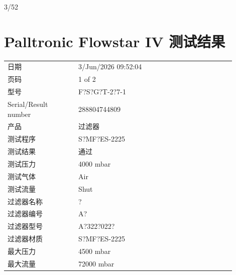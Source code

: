 \documentclass[UTF8,10pt,a4paper,fontset=fandol]{ctexart}
\newcommand{\fieldvalue}[1]{#1}
\newcommand{\handwritten}[1]{#1}
\begin{document}
\vspace{1em}
\handwritten{3/52}

\newpage

\section{Palltronic Flowstar IV 测试结果}

\begin{tabular}{@{}p{0.28\linewidth}p{0.62\linewidth}@{}}
日期 &
\fieldvalue{3/Jun/2026 09:52:04}
\\
页码 &
\fieldvalue{1 of 2}
\\
型号 &
\fieldvalue{F?S?G?T-2?7-1}
\\
Serial/Result number &
\fieldvalue{288804744809}
\\
产品 &
\fieldvalue{过滤器}
\\
测试程序 &
\fieldvalue{S?MF?ES-2225}
\\
测试结果 &
\fieldvalue{通过}
\\
测试压力 &
\fieldvalue{4000 mbar}
\\
测试气体 &
\fieldvalue{Air}
\\
测试流量 &
\fieldvalue{Shut}
\\
过滤器名称 &
\fieldvalue{?}
\\
过滤器编号 &
\fieldvalue{A?}
\\
过滤器型号 &
\fieldvalue{A?322?022?}
\\
过滤器材质 &
\fieldvalue{S?MF?ES-2225}
\\
最大压力 &
\fieldvalue{4500 mbar}
\\
最大流量 &
\fieldvalue{72000 mbar}
\end{tabular}
\end{document}
